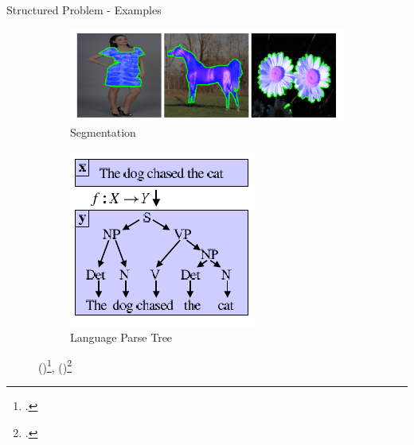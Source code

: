 \begin{frame}{Structured Problem - Examples}
    \begin{figure}
        \centering
        \begin{subfigure}[b]{0.4\textwidth}
            \includegraphics[width=\textwidth]{images/external/bertelli.png}
            \caption{Segmentation}
            \label{fig:bertelli}
        \end{subfigure}%
        \begin{subfigure}[b]{0.4\textwidth}
            \includegraphics[width=\textwidth]{images/external/joachims-struct-svm-example.png}
            \caption{Language Parse Tree}
            \label{fig:joachims}
        \end{subfigure}
        \caption{(\protect{})\footcite{bertelli_11_kernelized}, (\protect{})\footcite{joachims_04_support}}
    \end{figure}
\end{frame}


